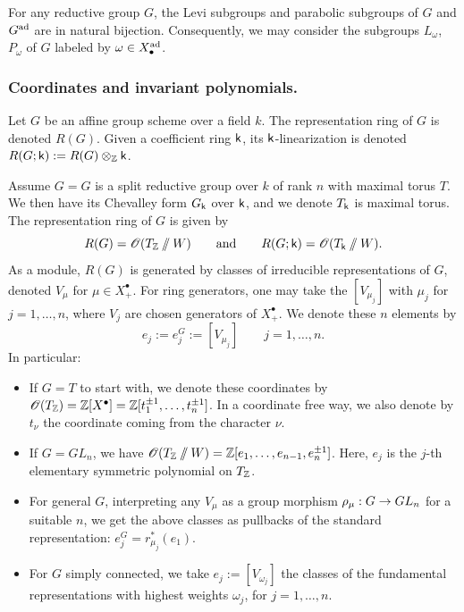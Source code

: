 For any reductive group $G$, the Levi subgroups and parabolic subgroups of $G$ and $G^{\operatorname{ad}}$ are in natural bijection. Consequently, we may consider the subgroups $L_{\omega}$, $P_{\omega}$ of $G$ labeled by $\omega \in X^{\operatorname{ad}}_{\bullet}$.


\subsubsection{Coordinates and invariant polynomials.}\label{subsubsection: coordinates and invariant polynomials}
Let $G$ be an affine group scheme over a field $k$.
The representation ring of $G$ is denoted $R(G)$. Given a coefficient ring $\mathsf{k}$, its $\mathsf{k}$-linearization is denoted $R(G;\mathsf{k}):= R(G) \otimes_{\operatorname{\mathbb{Z}}} \mathsf{k}$.




Assume $G = G$ is a split reductive group over $k$ of rank $n$ with maximal torus $T$. 
We then have its Chevalley form $G_{\mathsf{k}}$ over $\mathsf{k}$, and we denote $T_{\mathsf{k}}$ is maximal torus. The representation ring of $G$ is given by
\begin{equation*}
    R(G) = \operatorname{\mathscr{O}}(T_{\operatorname{\mathbb{Z}}} \sslash W) \qquad \text{and} \qquad R(G; \mathsf{k}) = \operatorname{\mathscr{O}}(T_{\mathsf{k}} \sslash W).
\end{equation*}
As a module, $R(G)$ is generated by classes of irreducible representations of $G$, denoted $V_{\mu}$ for $\mu \in X^{\bullet}_{+}$. For ring generators, one may take the $[V_{\mu_j}]$ with $\mu_j$ for $j =1, \dots, n$, where $V_j$ are chosen generators of $X^{\bullet}_{+}$. We denote these $n$ elements by
\begin{equation*}
    e_j := e_j^{G} := [V_{\mu_j}] \qquad j = 1, \dots, n.
\end{equation*}
In particular:
\begin{itemize}
\item 
If $G=T$ to start with, we denote these coordinates by
$\operatorname{\mathscr{O}}(T_{\operatorname{\mathbb{Z}}}) = \operatorname{\mathbb{Z}}[X^{\bullet}] = \operatorname{\mathbb{Z}}[t_1^{\pm 1}, \dots, t_n^{\pm 1}]$.
In a coordinate free way, we also denote by $t_{\nu}$ the coordinate coming from the character $\nu$. 
%
\item
If $G = GL_n$, we have $\operatorname{\mathscr{O}}(T_{\operatorname{\mathbb{Z}}} \sslash W) = \operatorname{\mathbb{Z}}[e_1, \dots, e_{n-1}, e_n^{\pm 1}]$. Here, $e_j$ is the $j$-th elementary symmetric polynomial on $T_{\operatorname{\mathbb{Z}}}$.
%
\item
For general $G$, interpreting any $V_{\mu}$ as a group morphism $\rho_{\mu}: G \to GL_n$ for a suitable $n$, we get the above classes as pullbacks of the standard representation: $e^{G}_j = r^*_{\mu_j} (e_1)$.
\item 
For $G$ simply connected, we take $e_j := [V_{\omega_j}]$ the classes of the fundamental representations with highest weights $\omega_j$, for $j = 1, \dots, n$.
\end{itemize}


